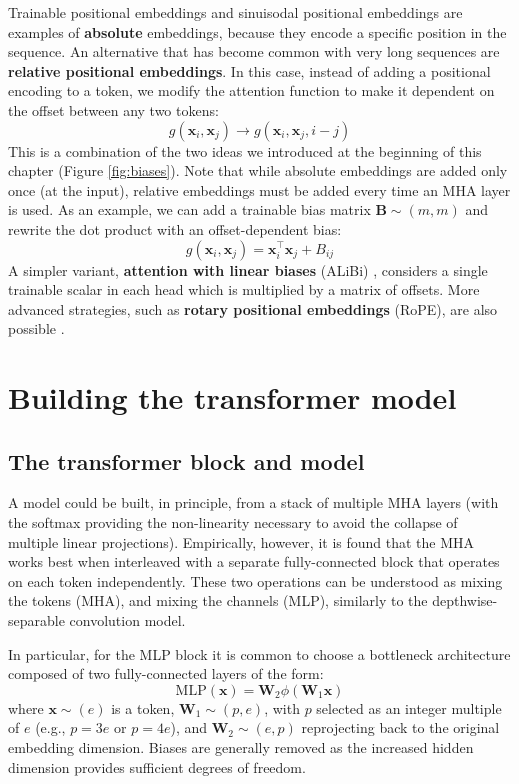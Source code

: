 Trainable positional embeddings and sinuisodal positional embeddings are examples of \textbf{absolute} embeddings, because they encode a specific position in the sequence. An alternative that has become common with very long sequences are \textbf{relative positional embeddings}. In this case, instead of adding a positional encoding to a token, we modify the attention function to make it dependent on the offset between any two tokens:
%
$$
g(\mathbf{x}_i, \mathbf{x}_j)\rightarrow g(\mathbf{x}_i, \mathbf{x}_j, i-j)
$$
%
This is a combination of the two ideas we introduced at the beginning of this chapter (Figure \ref{fig:biases}). Note that while absolute embeddings are added only once (at the input), relative embeddings must be added every time an MHA layer is used. As an example, we can add a trainable bias matrix $\mathbf{B} \sim (m,m)$ and rewrite the dot product with an offset-dependent bias:
%
$$
g(\mathbf{x}_i,\mathbf{x}_j)=\mathbf{x}_i^\top\mathbf{x}_j+B_{ij}
$$
%
A simpler variant, \textbf{attention with linear biases} (ALiBi) \cite{press2021train}, considers a single trainable scalar in each head which is multiplied by a matrix of offsets. More advanced strategies, such as \textbf{rotary positional embeddings} (RoPE), are also possible \cite{su2024roformer}.

\section{Building the transformer model}
\subsection{The transformer block and model}
\label{subsec:transformer_block}

A model could be built, in principle, from a stack of multiple MHA layers (with the softmax providing the non-linearity necessary to avoid the collapse of multiple linear projections). Empirically, however, it is found that the MHA works best when interleaved with a separate fully-connected block that operates on each token independently. These two operations can be understood as mixing the tokens (MHA), and mixing the channels (MLP), similarly to the depthwise-separable convolution  model.

In particular, for the MLP block it is common to choose a bottleneck architecture composed of two fully-connected layers of the form:
%
$$
\text{MLP}(\mathbf{x})=\mathbf{W}_2\phi\left(\mathbf{W}_1\mathbf{x}\right)
$$
%
where $\mathbf{x} \sim (e)$ is a token, $\mathbf{W}_1 \sim (p, e)$, with $p$ selected as an integer multiple of $e$ (e.g., $p=3e$ or $p=4e$), and $\mathbf{W}_2 \sim (e,p)$ reprojecting back to the original embedding dimension. Biases are generally removed as the increased hidden dimension provides sufficient degrees of freedom.

